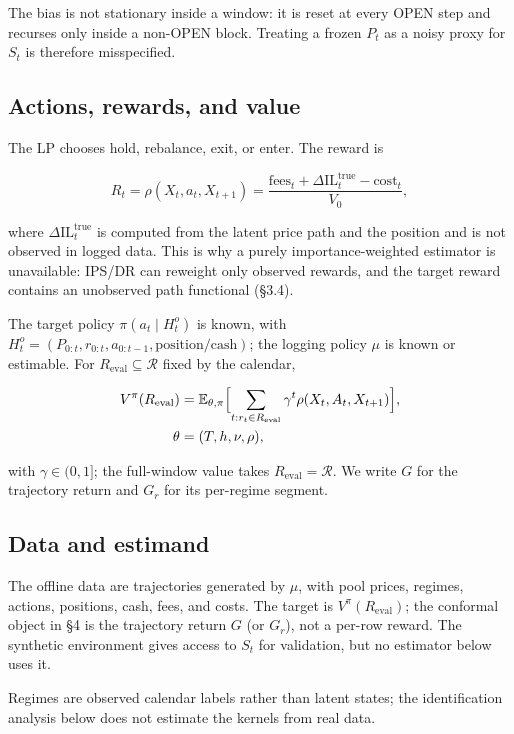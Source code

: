 The bias is not stationary inside a window: it is reset at every OPEN step and recurses only inside a non-OPEN block. Treating a frozen $P_t$ as a noisy proxy for $S_t$ is therefore misspecified.

\subsection{Actions, rewards, and value}

The LP chooses hold, rebalance, exit, or enter. The reward is

\[
R_t=\rho(X_t,a_t,X_{t+1})=\frac{\text{fees}_t+\Delta\mathrm{IL}^{\mathrm{true}}_t-\text{cost}_t}{V_0},
\]

where $\Delta\mathrm{IL}^{\mathrm{true}}_t$ is computed from the latent price path and the position and is not observed in logged data. This is why a purely importance-weighted estimator is unavailable: IPS/DR can reweight only observed rewards, and the target reward contains an unobserved path functional (\S3.4).

The target policy $\pi(a_t\mid H_t^o)$ is known, with $H_t^o=(P_{0:t},r_{0:t},a_{0:t-1},\text{position/cash})$; the logging policy $\mu$ is known or estimable. For $R_{\mathrm{eval}}\subseteq\mathcal R$ fixed by the calendar,

\[
\begin{aligned}
V^\pi(R_{\mathrm{eval}})&=\mathbb E_{\theta,\pi}\Bigl[\sum_{t:r_t\in R_{\mathrm{eval}}}\gamma^t\rho(X_t,A_t,X_{t+1})\Bigr],\\
\theta&=(T,h,\nu,\rho),
\end{aligned}
\]

with $\gamma\in(0,1]$; the full-window value takes $R_{\mathrm{eval}}=\mathcal R$. We write $G$ for the trajectory return and $G_r$ for its per-regime segment.

\subsection{Data and estimand}

The offline data are trajectories generated by $\mu$, with pool prices, regimes, actions, positions, cash, fees, and costs. The target is $V^\pi(R_{\mathrm{eval}})$; the conformal object in \S4 is the trajectory return $G$ (or $G_r$), not a per-row reward. The synthetic environment gives access to $S_t$ for validation, but no estimator below uses it.

Regimes are observed calendar labels rather than latent states; the identification analysis below does not estimate the kernels from real data.


